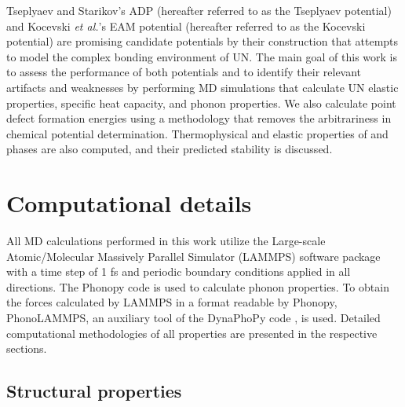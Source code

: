 \documentclass[preprint, 12pt]{elsarticle}
\begin{document}
Tseplyaev and Starikov's ADP (hereafter referred to as the Tseplyaev potential) and Kocevski \textit{et al.}'s EAM potential (hereafter referred to as the Kocevski potential) are promising candidate potentials by their construction that attempts to model the complex bonding environment of UN. The main goal of this work is to assess the performance of both potentials and to identify their relevant artifacts and weaknesses by performing MD simulations that calculate UN elastic properties, specific heat capacity, and phonon properties. We also calculate point defect formation energies using a methodology that removes the arbitrariness in chemical potential determination. Thermophysical and elastic properties of  and  phases are also computed, and their predicted stability is discussed. 

\section{Computational details}

All MD calculations performed in this work utilize the Large-scale Atomic/Molecular Massively Parallel Simulator (LAMMPS) software package \cite{Thompson2022} with a time step of 1 fs and periodic boundary conditions applied in all directions. The Phonopy code \cite{Togo2015II} is used to calculate phonon properties. To obtain the forces calculated by LAMMPS in a format readable by Phonopy, PhonoLAMMPS, an auxiliary tool of the DynaPhoPy code \cite{Carreras2017}, is used. Detailed computational methodologies of all properties are presented in the respective sections.

\subsection{Structural properties}
\end{document}
